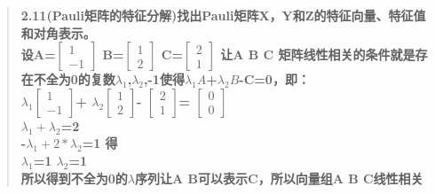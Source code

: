 \documentclass[UTF8,12pt]{article}
\begin{document}
\begin{CJK}{UTF8}{gbsn}
\begin{quote}
\bf{2.11(Pauli矩阵的特征分解)找出Pauli矩阵X，Y和Z的特征向量、特征值和对角表示。}\\
  设A=$\begin{bmatrix}1\\-1\end{bmatrix}$
B=$\begin{bmatrix}1\\2\end{bmatrix}$
C=$\begin{bmatrix}2\\1\end{bmatrix}$
让A B C 矩阵线性相关的条件就是存在不全为0的复数$\lambda_1$,$\lambda_2$,-1使得$\lambda_1A$+$\lambda_2B$-C=0，即：\\
$\lambda_1\begin{bmatrix}1\\-1\end{bmatrix}$+
$\lambda_2\begin{bmatrix}1\\2\end{bmatrix}$-
$\begin{bmatrix}2\\1\end{bmatrix}$=
$\begin{bmatrix}0\\0\end{bmatrix}$\\
$\lambda_1+\lambda_2$=2\\
-$\lambda_1+2*\lambda_2$=1    得\\
$\lambda_1$=1
$\lambda_2$=1\\
所以得到不全为0的$\lambda$序列让A B可以表示C，所以向量组A B C线性相关
\end{quote}

\end{CJK}
\end{document}
